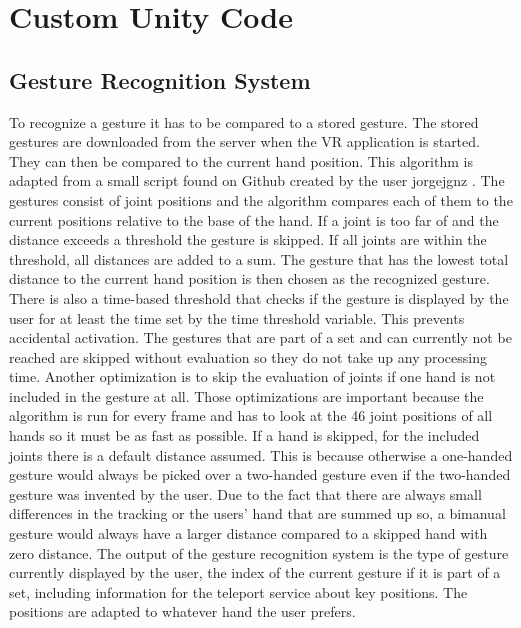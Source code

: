 \section{Custom Unity Code}

\subsection{Gesture Recognition System}
To recognize a gesture it has to be compared to a stored gesture. The stored gestures are downloaded from the server when the VR application is started. They can then be compared to the current hand position. This algorithm is adapted from a small script found on Github created by the user jorgejgnz \cite{github}.
The gestures consist of joint positions and the algorithm compares each of them to the current positions relative to the base of the hand. If a joint is too far of and the distance exceeds a threshold the gesture is skipped. If all joints are within the threshold, all distances are added to a sum. The gesture that has the lowest total distance to the current hand position is then chosen as the recognized gesture. There is also a time-based threshold that checks if the gesture is displayed by the user for at least the time set by the time threshold variable. This prevents accidental activation. The gestures that are part of a set and can currently not be reached are skipped without evaluation so they do not take up any processing time. Another optimization is to skip the evaluation of joints if one hand is not included in the gesture at all. Those optimizations are important because the algorithm is run for every frame and has to look at the 46 joint positions of all hands so it must be as fast as possible.
If a hand is skipped, for the included joints there is a default distance assumed. This is because otherwise a one-handed gesture would always be picked over a two-handed gesture even if the two-handed gesture was invented by the user. Due to the fact that there are always small differences in the tracking or the users' hand that are summed up so, a bimanual gesture would always have a larger distance compared to a skipped hand with zero distance. 
The output of the gesture recognition system is the type of gesture currently displayed by the user, the index of the current gesture if it is part of a set, including information for the teleport service about key positions. The positions are adapted to whatever hand the user prefers.

